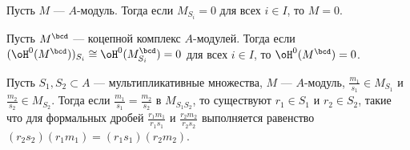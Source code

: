 \documentclass[
	extrafontsizes,
	11pt,
	hyphens,
]{memoir}
\begin{document}
\begin{corollary}
Пусть \(M\) --- \(A\)-мо\-дуль. Тогда если \(M_{S_i} = 0\) для всех \(i \in I\), то \(M = 0\).
\end{corollary}

\begin{corollary} \label{cor:LocCoverExa}
Пусть \(M^{\bcd}\) --- коцепной комплекс \(A\)-мо\-ду\-лей.
Тогда если \((\oH^0(M^{\bcd}))_{S_i} \cong \oH^0(M^{\bcd}_{S_i}) = 0\) для всех \(i \in I\), то \(\oH^0(M^{\bcd}) = 0\).
\end{corollary}


\begin{observation} \label{obs:LocalFibFrac}
Пусть \(S_1, S_2 \subset A\) --- мультипликативные множества, \(M\) --- \(A\)-мо\-дуль,
\(\frac{m_1}{s_1} \in M_{S_1}\) и \(\frac{m_2}{s_2} \in M_{S_2}\).
Тогда если \(\frac{m_1}{s_1} = \frac{m_2}{s_2}\) в \(M_{S_1 S_2}\), то существуют \(r_1 \in S_1\) и \(r_2 \in S_2\), такие что
для формальных дробей \(\frac{r_1 m_1}{r_1 s_1}\) и \(\frac{r_2 m_2}{r_2 s_2}\)
выполняется равенство
\((r_2 s_2) (r_1 m_1) = (r_1 s_1) (r_2 m_2)\).
\end{observation}


\end{document}
